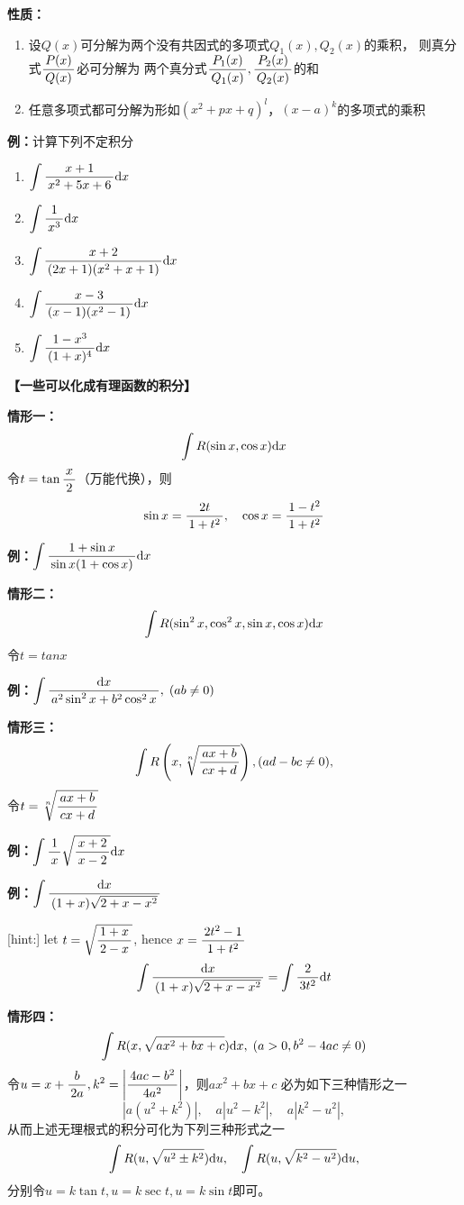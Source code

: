 {\bf 性质：}
\begin{enumerate}
  \setlength{\itemindent}{1cm}
  \item 设$Q(x)$可分解为两个没有共因式的多项式$Q_1(x),Q_2(x)$的乘积，
  则真分式$\df{P(x)}{Q(x)}$必可分解为
  两个真分式$\df{P_1(x)}{Q_1(x)},\df{P_2(x)}{Q_2(x)}$的和
  \item 任意多项式都可分解为形如$(x^2+px+q)^l$，$(x-a)^k$的多项式的乘积
\end{enumerate}

{\bf 例：}计算下列不定积分
\begin{enumerate}[(1)]
  \setlength{\itemindent}{1cm}
  \item $\dint\df{x+1}{x^2+5x+6}\d x$ 
  \item $\dint\df1{x^3}\d x$
  \item $\dint\df{x+2}{(2x+1)(x^2+x+1)}\d x$
  \item $\dint\df{x-3}{(x-1)(x^2-1)}\d x$
  \item $\dint\df{1-x^3}{(1+x)^4}\d x$
\end{enumerate}

{\bf 【一些可以化成有理函数的积分】}

{\bf 情形一：}
$$\dint R(\sin x,\cos x)\d x$$
令$t=\tan\df x2$（万能代换），则
$$\sin x=\df{2t}{1+t^2},\quad\cos x=\df{1-t^2}{1+t^2}$$

{\bf 例：}$\dint\df{1+\sin x}{\sin x(1+\cos x)}\d x$

{\bf 情形二：}
$$\dint R(\sin^2x,\cos^2x,\sin x,\cos x)\d x$$
令$t=tan x$

{\bf 例：}$\dint\df{\d x}{a^2\sin^2x+b^2\cos^2x},\;(ab\ne 0)$

{\bf 情形三：}
$$\dint R\left(x,\sqrt[n]{\df{ax+b}{cx+d}}\right),(ad-bc\ne0),$$
令$t=\sqrt[n]{\df{ax+b}{cx+d}}$

{\bf 例：}$\dint\df1x\sqrt{\df{x+2}{x-2}}\d x$

{\bf 例：}$\dint\df{\d x}{(1+x)\sqrt{2+x-x^2}}$

[hint:] let $t=\sqrt{\df{1+x}{2-x}}$, hence $x=\df{2t^2-1}{1+t^2}$
$$\dint\df{\d x}{(1+x)\sqrt{2+x-x^2}}=\dint\df2{3t^2}\d t$$

{\bf 情形四：}
$$\dint R(x,\sqrt{ax^2+bx+c})\d x,\;(a>0,b^2-4ac\ne0)$$
令$u=x+\df b{2a},k^2=\left|\df{4ac-b^2}{4a^2}\right|$，则$ax^2+bx+c$
必为如下三种情形之一
$$|a(u^2+k^2)|,\quad a|u^2-k^2|,\quad a|k^2-u^2|,$$
从而上述无理根式的积分可化为下列三种形式之一
$$\dint R(u,\sqrt{u^2\pm k^2})\d u,\quad\dint R(u,\sqrt{k^2-u^2})\d u,$$
分别令$u=k\tan t,u=k\sec t,u=k\sin t$即可。

